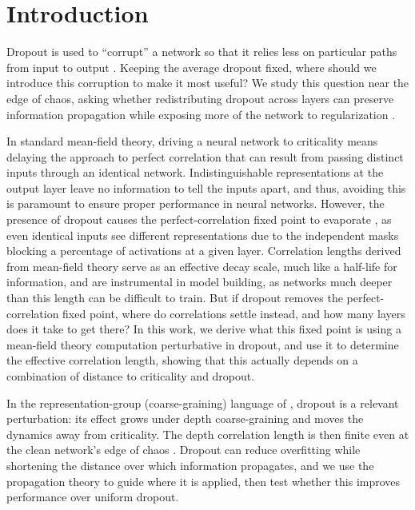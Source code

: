 \section{Introduction}
Dropout is used to ``corrupt'' a network so that it relies less on particular paths from input to output \cite{srivastava2014dropout}. Keeping the average dropout fixed, where should we introduce this corruption to make it most useful? We study this question near the edge of chaos, asking whether redistributing dropout across layers can preserve information propagation while exposing more of the network to regularization \cite{poole2016exponentialexpressivitydeepneural,schoenholz2017deepinformationpropagation,Bahri2020StatMechDeepLearning,bahri2024leshoucheslecturesdeep}.

In standard mean-field theory, driving a neural network to criticality means delaying the approach to perfect correlation that can result from passing distinct inputs through an identical network. Indistinguishable representations at the output layer leave no information to tell the inputs apart, and thus, avoiding this is paramount to ensure proper performance in neural networks. However, the presence of dropout causes the perfect-correlation fixed point to evaporate \cite{schoenholz2017deepinformationpropagation}, as even identical inputs see different representations due to the independent masks blocking a percentage of activations at a given layer. Correlation lengths derived from mean-field theory serve as an effective decay scale, much like a half-life for information, and are instrumental in model building, as networks much deeper than this length can be difficult to train. But if dropout removes the perfect-correlation fixed point, where do correlations settle instead, and how many layers does it take to get there? In this work, we derive what this fixed point is using a mean-field theory computation perturbative in dropout, and use it to determine the effective correlation length, showing that this actually depends on a combination of distance to criticality and dropout.

In the representation-group (coarse-graining) language of \cite{roberts2022principlesdeeplearningtheory,bahri2024leshoucheslecturesdeep}, dropout is a relevant perturbation: its effect grows under depth coarse-graining and moves the dynamics away from criticality. The depth correlation length is then finite even at the clean network's edge of chaos \cite{sompolinsky1988chaos,packard1988adaptation,bertschinger2004real}. Dropout can reduce overfitting while shortening the distance over which information propagates, and we use the propagation theory to guide where it is applied, then test whether this improves performance over uniform dropout.



